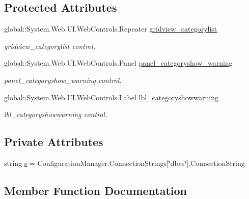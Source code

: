 \subsection*{Protected Attributes}
\begin{DoxyCompactItemize}
\item 
global\+::\+System.\+Web.\+U\+I.\+Web\+Controls.\+Repeater \mbox{\hyperlink{class_admin__category_list_af0fc1f8772137313d07684077c042703}{gridview\+\_\+categorylist}}
\begin{DoxyCompactList}\small\item\em gridview\+\_\+categorylist control. \end{DoxyCompactList}\item 
global\+::\+System.\+Web.\+U\+I.\+Web\+Controls.\+Panel \mbox{\hyperlink{class_admin__category_list_ab8aa84b5a360efafb723d2b8e960fac4}{panel\+\_\+categoryshow\+\_\+warning}}
\begin{DoxyCompactList}\small\item\em panel\+\_\+categoryshow\+\_\+warning control. \end{DoxyCompactList}\item 
global\+::\+System.\+Web.\+U\+I.\+Web\+Controls.\+Label \mbox{\hyperlink{class_admin__category_list_ad0e8738766fdf3c130e36fd6cd792e68}{lbl\+\_\+categoryshowwarning}}
\begin{DoxyCompactList}\small\item\em lbl\+\_\+categoryshowwarning control. \end{DoxyCompactList}\end{DoxyCompactItemize}
\subsection*{Private Attributes}
\begin{DoxyCompactItemize}
\item 
string \mbox{\hyperlink{class_admin__category_list_a0b85585d2b612ad7bf920ee63b0faecd}{s}} = Configuration\+Manager.\+Connection\+Strings\mbox{[}\char`\"{}dbcs\char`\"{}\mbox{]}.Connection\+String
\end{DoxyCompactItemize}


\subsection{Member Function Documentation}
\mbox{\label{class_admin__category_list_a1bb5e5965ec5c808c83a9650e8abf823}} 
